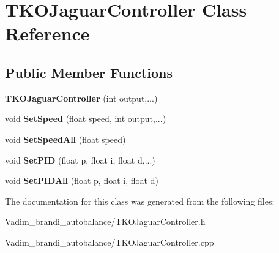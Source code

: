 \hypertarget{class_t_k_o_jaguar_controller}{\section{T\-K\-O\-Jaguar\-Controller Class Reference}
\label{class_t_k_o_jaguar_controller}
}
\subsection*{Public Member Functions}
\begin{DoxyCompactItemize}
\item 
\hypertarget{class_t_k_o_jaguar_controller_aa34ffcf295c49eb460d6e5e33398e275}{{\bfseries T\-K\-O\-Jaguar\-Controller} (int output,...)}\label{class_t_k_o_jaguar_controller_aa34ffcf295c49eb460d6e5e33398e275}

\item 
\hypertarget{class_t_k_o_jaguar_controller_a8b68e1b11d252bfb667c2d55742bf02a}{void {\bfseries Set\-Speed} (float speed, int output,...)}\label{class_t_k_o_jaguar_controller_a8b68e1b11d252bfb667c2d55742bf02a}

\item 
\hypertarget{class_t_k_o_jaguar_controller_a02f4863edb82ebbbcbd72c6d9d8599db}{void {\bfseries Set\-Speed\-All} (float speed)}\label{class_t_k_o_jaguar_controller_a02f4863edb82ebbbcbd72c6d9d8599db}

\item 
\hypertarget{class_t_k_o_jaguar_controller_a061cdb655b7184299c25f7eebac497d9}{void {\bfseries Set\-P\-I\-D} (float p, float i, float d,...)}\label{class_t_k_o_jaguar_controller_a061cdb655b7184299c25f7eebac497d9}

\item 
\hypertarget{class_t_k_o_jaguar_controller_a5ce3ec3d304a0661b7cd4c1c6913f81b}{void {\bfseries Set\-P\-I\-D\-All} (float p, float i, float d)}\label{class_t_k_o_jaguar_controller_a5ce3ec3d304a0661b7cd4c1c6913f81b}

\end{DoxyCompactItemize}


The documentation for this class was generated from the following files\-:\begin{DoxyCompactItemize}
\item 
Vadim\-\_\-brandi\-\_\-autobalance/T\-K\-O\-Jaguar\-Controller.\-h\item 
Vadim\-\_\-brandi\-\_\-autobalance/T\-K\-O\-Jaguar\-Controller.\-cpp\end{DoxyCompactItemize}
